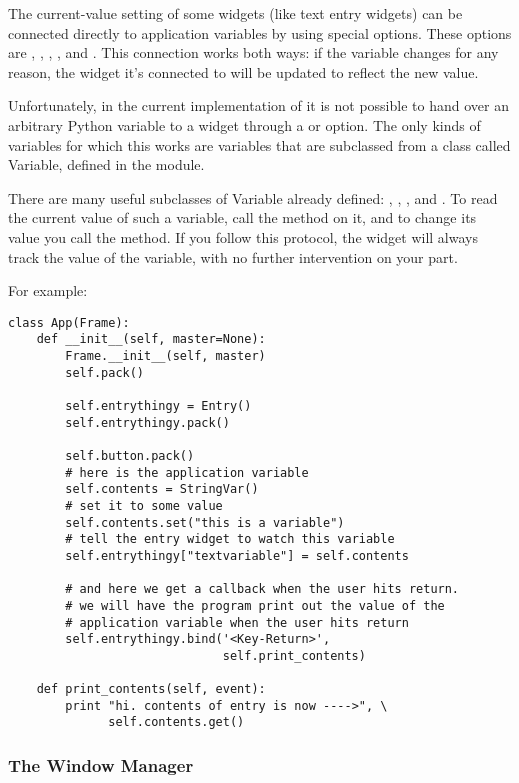 The current-value setting of some widgets (like text entry widgets)
can be connected directly to application variables by using special
options.  These options are , ,
, , and .  This
connection works both ways: if the variable changes for any reason,
the widget it's connected to will be updated to reflect the new value. 

Unfortunately, in the current implementation of  it is
not possible to hand over an arbitrary Python variable to a widget
through a  or  option.  The only
kinds of variables for which this works are variables that are
subclassed from a class called Variable, defined in the
 module.

There are many useful subclasses of Variable already defined:
, , , and
.  To read the current value of such a variable,
call the  method on
it, and to change its value you call the  method.  If
you follow this protocol, the widget will always track the value of
the variable, with no further intervention on your part.

For example: 
\begin{verbatim}
class App(Frame):
    def __init__(self, master=None):
        Frame.__init__(self, master)
        self.pack()
        
        self.entrythingy = Entry()
        self.entrythingy.pack()
        
        self.button.pack()
        # here is the application variable
        self.contents = StringVar()
        # set it to some value
        self.contents.set("this is a variable")
        # tell the entry widget to watch this variable
        self.entrythingy["textvariable"] = self.contents
        
        # and here we get a callback when the user hits return.
        # we will have the program print out the value of the
        # application variable when the user hits return
        self.entrythingy.bind('<Key-Return>',
                              self.print_contents)

    def print_contents(self, event):
        print "hi. contents of entry is now ---->", \
              self.contents.get()
\end{verbatim}


\subsubsection{The Window Manager} %

